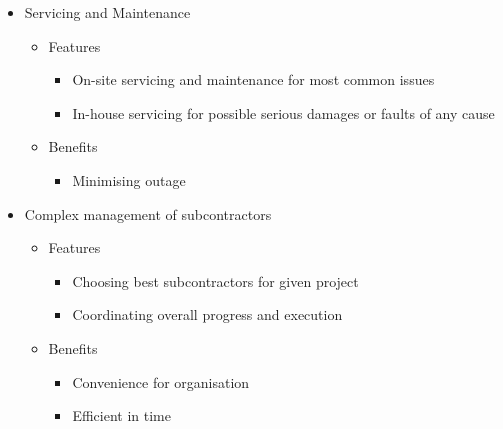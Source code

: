 \documentclass[a4paper,11pt]{article}
\begin{document}
\begin{itemize}
	\item Servicing and Maintenance
	
	\begin{itemize}
		\item Features
		
		\begin{itemize}
			\item On-site servicing and maintenance for most common issues
			\item In-house servicing for possible serious damages or faults of any cause
		\end{itemize}
		
		\item Benefits
		
		\begin{itemize}
			\item Minimising outage
		\end{itemize}
	\end{itemize}
	
	\item Complex management of subcontractors
	
	\begin{itemize}
		\item Features
		
		\begin{itemize}
			\item Choosing best subcontractors for given project
			\item Coordinating overall progress and execution
		\end{itemize}
		
		\item Benefits
		
		\begin{itemize}
			\item Convenience for organisation
			\item Efficient in time
		\end{itemize}
	\end{itemize}
\end{itemize}
	
\end{document}
